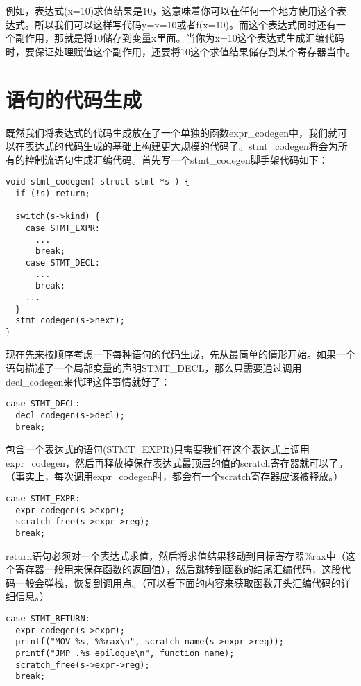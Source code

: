 \documentclass[cn,11pt,chinese]{elegantbook}
\begin{document}
例如，表达式(x=10)求值结果是10，这意味着你可以在任何一个地方使用这个表达式。所以我们可以这样写代码y=x=10或者f(x=10)。而这个表达式同时还有一个副作用，那就是将10储存到变量x里面。当你为x=10这个表达式生成汇编代码时，要保证处理赋值这个副作用，还要将10这个求值结果储存到某个寄存器当中。

\section{语句的代码生成}

既然我们将表达式的代码生成放在了一个单独的函数expr\_codegen中，我们就可以在表达式的代码生成的基础上构建更大规模的代码了。stmt\_codegen将会为所有的控制流语句生成汇编代码。首先写一个stmt\_codegen脚手架代码如下：

\begin{verbatim}
void stmt_codegen( struct stmt *s ) {
  if (!s) return;
  
  switch(s->kind) {
    case STMT_EXPR:
      ...
      break;
    case STMT_DECL:
      ...
      break;
    ...
  }
  stmt_codegen(s->next);
}
\end{verbatim}

现在先来按顺序考虑一下每种语句的代码生成，先从最简单的情形开始。如果一个语句描述了一个局部变量的声明STMT\_DECL，那么只需要通过调用decl\_codegen来代理这件事情就好了：

\begin{verbatim}
case STMT_DECL:
  decl_codegen(s->decl);
  break;
\end{verbatim}

包含一个表达式的语句(STMT\_EXPR)只需要我们在这个表达式上调用expr\_codegen，然后再释放掉保存表达式最顶层的值的scratch寄存器就可以了。（事实上，每次调用expr\_codegen时，都会有一个scratch寄存器应该被释放。）

\begin{verbatim}
case STMT_EXPR:
  expr_codegen(s->expr);
  scratch_free(s->expr->reg);
  break;
\end{verbatim}

return语句必须对一个表达式求值，然后将求值结果移动到目标寄存器\%rax中（这个寄存器一般用来保存函数的返回值），然后跳转到函数的结尾汇编代码，这段代码一般会弹栈，恢复到调用点。（可以看下面的内容来获取函数开头汇编代码的详细信息。）

\begin{verbatim}
case STMT_RETURN:
  expr_codegen(s->expr);
  printf("MOV %s, %%rax\n", scratch_name(s->expr->reg));
  printf("JMP .%s_epilogue\n", function_name);
  scratch_free(s->expr->reg);
  break;
\end{verbatim}
\end{document}
